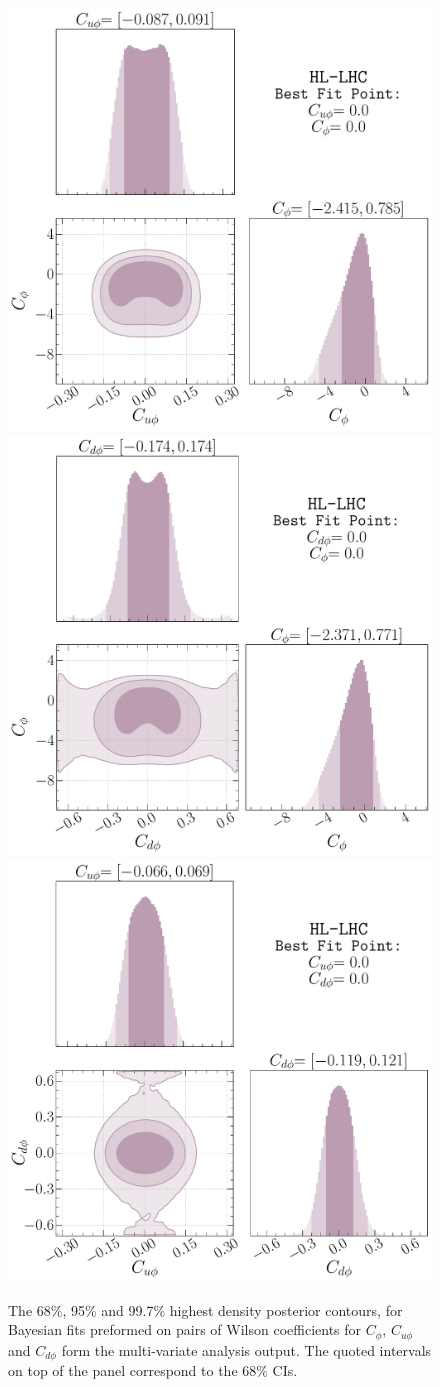 \begin{figure}[htpb!]
	\centering
	\includegraphics[width=0.4\linewidth]{fig/kappa_u-kappa_l-HL-LHC.pdf}
	\includegraphics[width=0.4\linewidth]{fig/kappa_d-kappa_l-HL-LHC.pdf}
	\includegraphics[width=0.4\linewidth]{fig/kappa_u-kappa_d-HL-LHC.pdf}
	\caption{The  68\%, 95\% and 99.7\% highest density posterior contours, for Bayesian fits preformed on pairs of Wilson coefficients for $C_\phi$, $C_{u\phi}$ and $C_{d\phi}$ form the multi-variate analysis output. The quoted intervals on top of the panel correspond to the 68\% CIs.}
	\label{fig:constraint2d}
\end{figure}
